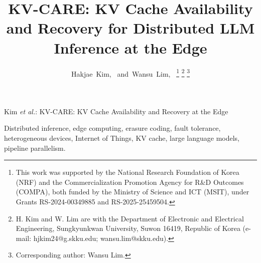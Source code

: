 \documentclass[journal]{IEEEtran}
\newcommand{\sys}{KV-CARE\xspace}
\begin{document}
\title{\sys{}: KV Cache Availability and Recovery for Distributed LLM Inference at the Edge}

\author{Hakjae~Kim,~
  and~Wansu~Lim,~
  \thanks{This work was supported by the National Research Foundation of Korea (NRF) and the Commercialization Promotion Agency for R\&D Outcomes (COMPA), both funded by the Ministry of Science and ICT (MSIT), under Grants RS-2024-00349885 and RS-2025-25459504.}
  \thanks{H. Kim and W. Lim are with the Department of Electronic and
  Electrical Engineering, Sungkyunkwan University, Suwon 16419, Republic of
  Korea (e-mail: hjkim24@g.skku.edu; wansu.lim@skku.edu).}%
  \thanks{Corresponding author: Wansu Lim.}}

%
{Kim \MakeLowercase{\textit{et al.}}: \sys{}: KV Cache Availability and Recovery at the Edge}

\maketitle



\begin{IEEEkeywords}
Distributed inference, edge computing, erasure coding, fault tolerance,
heterogeneous devices, Internet of Things, KV cache, large language models,
pipeline parallelism.
\end{IEEEkeywords}

\IEEEpeerreviewmaketitle









\end{document}
